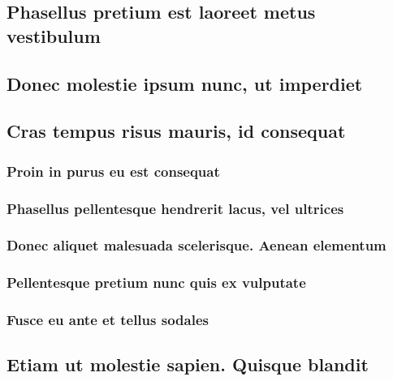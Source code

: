 \documentclass[%
  german,%
  exercise,%
  oneside,%
]{iswartcl}
\begin{document}
\lipsum[1-8]

\subsection{Phasellus pretium est laoreet metus vestibulum}

\lipsum[1-8]

\subsection{Donec molestie ipsum nunc, ut imperdiet}

\lipsum[1-8]

\subsection{Cras tempus risus mauris, id consequat}

\lipsum[1-8]

\subsubsection{Proin in purus eu est consequat}

\lipsum[1-8]

\subsubsection{Phasellus pellentesque hendrerit lacus, vel ultrices}

\lipsum[1-8]

\subsubsection{Donec aliquet malesuada scelerisque. Aenean elementum}

\lipsum[1-8]

\subsubsection{Pellentesque pretium nunc quis ex vulputate}

\lipsum[1-8]

\subsubsection{Fusce eu ante et tellus sodales}

\lipsum[1-8]

\subsection{Etiam ut molestie sapien. Quisque blandit}
\end{document}
